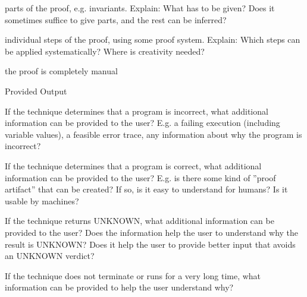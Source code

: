 \documentclass[a4paper]{article}
\begin{document}
\begin{minipage}[t]{0.16\linewidth}
\begin{betterlist}
\begin{betterlist}
			\item \checkboxUnchecked parts of the proof, e.g. invariants. Explain: What has to be given? Does it sometimes suffice to give parts, and the rest can be inferred?
			\item \checkboxUnchecked individual steps of the proof, using some proof system. Explain: Which steps can be applied systematically? Where is creativity needed?
			\item \checkboxUnchecked the proof is completely manual
		\end{betterlist}
		\item \alert{Provided Output}
		\begin{betterlist}
			\item If the technique determines that a program is incorrect, what additional information can be provided to the user? E.g. a failing execution (including variable values), a feasible error trace, any information about why the program is incorrect?

			\item If the technique determines that a program is correct, what additional information can be provided to the user? E.g. is there some kind of ”proof artifact” that can be created? If so, is it easy to understand for humans? Is it usable by machines?

			\item If the technique returns UNKNOWN, what additional information can be provided to the user? Does the information help the user to understand why the result is UNKNOWN? Does it help the user to provide better input that avoids an UNKNOWN verdict?

			\item If the technique does not terminate or runs for a very long time, what information can be provided to help the user understand why?


\end{betterlist}
\end{betterlist}
\end{minipage}
\end{document}

